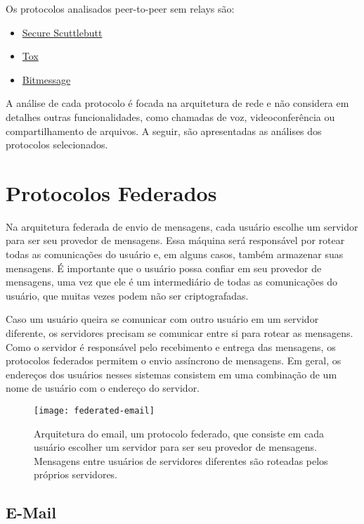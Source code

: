 Os protocolos analisados peer-to-peer sem relays são:
\begin{itemize}
  \item \href{https://scuttlebutt.nz/}{Secure Scuttlebutt}
  \item \href{https://tox.chat/}{Tox}
  \item \href{https://bitmessage.org/}{Bitmessage}
\end{itemize}

A análise de cada protocolo é focada na arquitetura de rede e não considera em detalhes outras funcionalidades, como chamadas de voz, videoconferência ou compartilhamento de arquivos. A seguir, são apresentadas as análises dos protocolos selecionados.

\section{Protocolos Federados}

Na arquitetura federada de envio de mensagens, cada usuário escolhe um servidor para ser seu provedor de mensagens. Essa máquina será responsável por rotear todas as comunicações do usuário e, em alguns casos, também armazenar suas mensagens. É importante que o usuário possa confiar em seu provedor de mensagens, uma vez que ele é um intermediário de todas as comunicações do usuário, que muitas vezes podem não ser criptografadas.

Caso um usuário queira se comunicar com outro usuário em um servidor diferente, os servidores precisam se comunicar entre si para rotear as mensagens. Como o servidor é responsável pelo recebimento e entrega das mensagens, os protocolos federados permitem o envio assíncrono de mensagens. Em geral, os endereços dos usuários nesses sistemas consistem em uma combinação de um nome de usuário com o endereço do servidor.

\begin{figure}
  \centering
  \texttt{[image: federated-email]}

  \caption{Arquitetura do email, um protocolo federado, que consiste em cada usuário escolher um servidor para ser seu provedor de mensagens. Mensagens entre usuários de servidores diferentes são roteadas pelos próprios servidores. \cite{email-picture}}
\end{figure}

\subsection{E-Mail}

